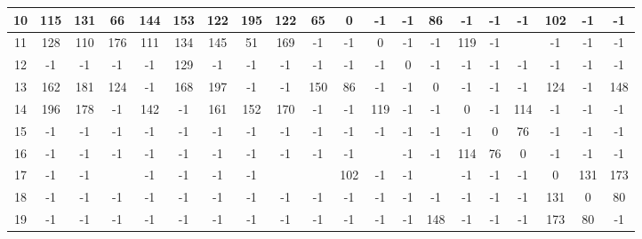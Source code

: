 \documentclass[UTF8,12pt]{ctexart}
\begin{document}
\begin{enumerate}
\begin{itemize}
\begin{table}[H]
{\begin{scriptsize}
\begin{tabular}{cccccccccccccccccccc}
                        \midrule
                        10 & 115    & 131    & 66     & 144    & 153    & 122    & 195    & 122    & 65     & 0      & -1     & -1     & 86     & -1     & -1     & -1     & 102    & -1     & -1  \\
                        \midrule
                        11 & 128    & 110    & 176    & 111    & 134    & 145    & 51     & 169    & -1     & -1     & 0      & -1     & -1     & 119    & -1     &        & -1     & -1     & -1  \\
                        \midrule
                        12 & -1     & -1     & -1     & -1     & 129    & -1     & -1     & -1     & -1     & -1     & -1     & 0      & -1     & -1     & -1     & -1     & -1     & -1     & -1  \\
                        \midrule
                        13 & 162    & 181    & 124    & -1     & 168    & 197    & -1     & -1     & 150    & 86     & -1     & -1     & 0      & -1     & -1     & -1     & 124    & -1     & 148  \\
                        \midrule
                        14 & 196    & 178    & -1     & 142    & -1     & 161    & 152    & 170    & -1     & -1     & 119    & -1     & -1     & 0      & -1     & 114    & -1     & -1     & -1  \\
                        \midrule
                        15 & -1     & -1     & -1     & -1     & -1     & -1     & -1     & -1     & -1     & -1     & -1     & -1     & -1     & -1     & 0      & 76     & -1     & -1     & -1  \\
                        \midrule
                        16 & -1     & -1     & -1     & -1     & -1     & -1     & -1     & -1     & -1     & -1     &        & -1     & -1     & 114    & 76     & 0      & -1     & -1     & -1  \\
                        \midrule
                        17 & -1     & -1     &        & -1     & -1     & -1     & -1     &        &        & 102    & -1     & -1     &        & -1     & -1     & -1     & 0      & 131    & 173  \\
                        \midrule
                        18 & -1     & -1     & -1     & -1     & -1     & -1     & -1     & -1     & -1     & -1     & -1     & -1     & -1     & -1     & -1     & -1     & 131    & 0      & 80  \\
                        \midrule
                        19 & -1     & -1     & -1     & -1     & -1     & -1     & -1     & -1     & -1     & -1     & -1     & -1     & 148    & -1     & -1     & -1     & 173    & 80     & -1  \\
                        \bottomrule
                        \end{tabular}
                        

\end{scriptsize}}
\end{table}
\end{itemize}
\end{enumerate}
\end{document}
